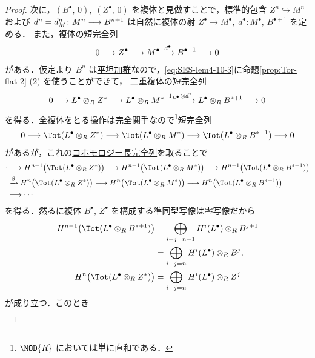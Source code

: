 \documentclass[algtopo_main]{subfiles}
\begin{document}
\begin{proof}
    次に，$(B^\bullet,\, 0),\; (Z^\bullet,\, 0)$ を複体と見做すことで，標準的包含 $Z^n \hookrightarrow M^n$ および $d^n = d_M^n \colon M^n \longrightarrow B^{n+1}$ は自然に複体の射 $Z^\bullet \to M^\bullet,\; d^\bullet \colon M^\bullet,\, B^{\bullet +1}$ を定める．
    また，複体の短完全列
    \begin{align}
        \label{eq:SES-lem4-10-3}
        0 \longrightarrow Z^\bullet \longrightarrow M^\bullet \xrightarrow{d^\bullet} B^{\bullet +1} \longrightarrow 0
    \end{align}
    がある．仮定より $B^n$ は\hyperref[def:flat-mod]{平坦加群}なので，\eqref{eq:SES-lem4-10-3}に命題\ref{prop:Tor-flat-2}-(2) を使うことができて，
    \hyperref[def:double-complex]{二重複体}の短完全列
    \begin{align}
        0 \longrightarrow L^\bullet \otimes_R Z^* \longrightarrow L^\bullet \otimes_R M^* \xrightarrow{1_{L^\bullet} \otimes d^*} L^\bullet \otimes_R B^{*+1} \longrightarrow 0
    \end{align}
    を得る．\hyperref[def:Tot]{全複体}をとる操作は完全関手なので\footnote{$\MOD{R}$ においては単に直和である．}短完全列
    \begin{align}
        0 \lto \Tot (L^\bullet \otimes_R Z^*) \lto \Tot(L^\bullet \otimes_R M^*) \lto \Tot(L^\bullet \otimes_R B^{*+1}) \lto 0
    \end{align}
    があるが，これの\hyperref[prop:LES-cohomology]{コホモロジー長完全列}を取ることで
    \begin{align}
        \cdot &\lto H^{n-1}\bigl(\Tot (L^\bullet \otimes_R Z^*)\bigr) \lto H^{n-1}\bigl( \Tot(L^\bullet \otimes_R M^*)\bigr) \lto H^{n-1}\bigl(\Tot(L^\bullet \otimes_R B^{*+1})\bigr) \\
        &\xrightarrow{\beta} H^n\bigl(\Tot (L^\bullet \otimes_R Z^*)\bigr) \lto H^n\bigl( \Tot(L^\bullet \otimes_R M^*)\bigr) \lto H^n\bigl(\Tot(L^\bullet \otimes_R B^{*+1})\bigr) \\
        &\lto \cdots
    \end{align}
    を得る．然るに複体 $B^\bullet,\, Z^\bullet$ を構成する準同型写像は零写像だから
    \begin{align}
        H^{n-1}\bigl(\Tot(L^\bullet \otimes_R B^{*+1})\bigr) &= \bigoplus_{i+j = n-1} H^i(L^\bullet) \otimes_R B^{j+1} \\
        &= \bigoplus_{i+j = n} H^i(L^\bullet) \otimes_R B^{j}, \\
        H^n\bigl(\Tot (L^\bullet \otimes_R Z^*)\bigr) &= \bigoplus_{i+j = n} H^i(L^\bullet) \otimes_R Z^{j}
    \end{align}
    が成り立つ．このとき
    \begin{align}

\end{align}
\end{proof}
\end{document}
